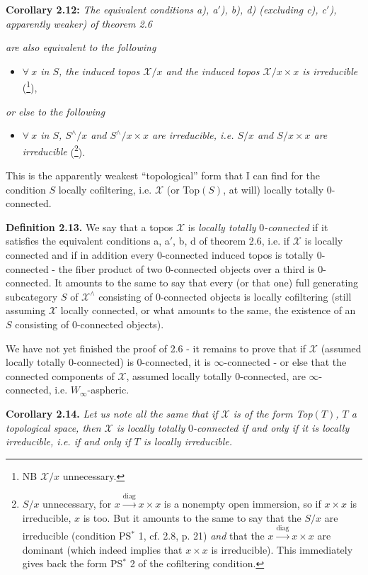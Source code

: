 \documentclass[11pt]{article}
\newcommand{\msp}[1]{\marginpar{\footnotesize [#1]}}
\newcommand{\X}{\mathcal{X}}
\begin{document}
\textbf{Corollary 2.12:} \textit{The equivalent conditions a), a$'$), b), d) (excluding c), c$'$), apparently weaker) of theorem 2.6}

\msp{page 29}\textit{are also equivalent to the following}
\begin{itemize}[leftmargin=2.5em]
\item[\textit{e)}] \textit{$\forall\ x$ in $S$, the induced topos $\X/x$ and the induced topos $\X/x\times x$ is irreducible} (\footnote[37]{NB $\X/x$ unnecessary.}),
\end{itemize}
\textit{or else to the following} %
\begin{itemize}[leftmargin=2.5em]
\item[\textit{e$'$)}] \textit{$\forall\ x$ in $S$, $S^\wedge/x$ and $S^\wedge/x{\times}x$ are irreducible, i.e. $S/x$ and $S/x{\times}x$ are irreducible} (\footnote[38]{$S/x$ unnecessary, for $x\xrightarrow{\mathrm{diag}}x\times x$ is a nonempty open immersion, so if $x\times x$ is irreducible, $x$ is too. But it amounts to the same to say that the $S/x$ are irreducible (condition PS$^*$ 1, cf. 2.8, p. 21) \textit{and} that the $x\xrightarrow{\mathrm{diag}}x\times x$ are dominant (which indeed implies that $x\times x$ is irreducible). This immediately gives back the form PS$^*$ 2 of the cofiltering condition. %
}).
\end{itemize}
This is the apparently weakest ``topological'' form that I can find for the condition $S$ locally cofiltering, i.e. $\X$ (or Top$(S)$, at will) locally totally 0-connected.

\textbf{Definition 2.13.} We say that a topos $\X$ is \textit{locally totally} $0$\textit{-connected} if it satisfies the equivalent conditions a, a$'$, b, d of theorem 2.6, i.e. if $\X$ is locally connected and if in addition every 0-connected induced topos is totally 0-connected - the fiber product of two 0-connected objects over a third is 0-connected. It amounts to the same to say that every (or that one) full generating subcategory $S$ of $\X^\wedge$ consisting of 0-connected objects is locally cofiltering (still assuming $\X$ locally connected, or what amounts to the same, the existence of an $S$ consisting of 0-connected objects).

We have not yet finished the proof of 2.6 - it remains to prove that if $\X$ (assumed locally totally 0-connected) is 0-connected, it is $\infty$-connected - or else that the connected components of $\X$, assumed locally totally 0-connected, are $\infty$-connected, i.e. $W_\infty$-aspheric.

\msp{page 30}\textbf{Corollary 2.14.} \textit{Let us note all the same that if $\X$ is of the form Top$(T)$, $T$ a topological space, then $\X$ is locally totally} $0$\textit{-connected if and only if it is locally irreducible, i.e. if and only if $T$ is locally irreducible.}
\end{document}
